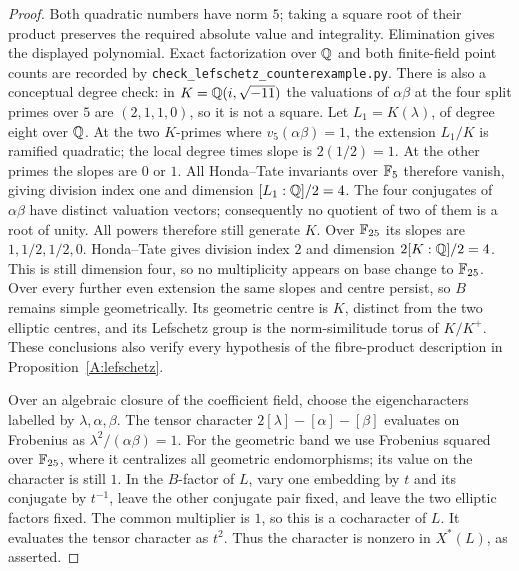\begin{proof}
Both quadratic numbers have norm $5$; taking a square root of
their product preserves the required absolute value and
integrality. Elimination gives the displayed polynomial. Exact
factorization over $\mathbb Q$ and both finite-field point counts are
recorded by \texttt{check\_lefschetz\_counterexample.py}.
There is also a conceptual degree check: in
$K=\mathbb Q(i,\sqrt{-11})$ the valuations of $\alpha\beta$ at the
four split primes over $5$ are $(2,1,1,0)$, so it is not a square.
Let $L_1=K(\lambda)$, of degree eight over $\mathbb Q$. At the two
$K$-primes where $v_5(\alpha\beta)=1$, the extension $L_1/K$
is ramified quadratic; the local degree times slope is
$2(1/2)=1$. At the other primes the slopes are $0$ or $1$.
All Honda--Tate invariants over $\mathbb F_5$ therefore vanish, giving
division index one and dimension $[L_1:\mathbb Q]/2=4$.
The four conjugates of $\alpha\beta$ have distinct valuation vectors; consequently
no quotient of two of them is a root of unity. All powers
therefore still generate $K$. Over $\mathbb F_{25}$ its slopes are
$1,1/2,1/2,0$. Honda--Tate gives division index $2$ and dimension
$2[K:\mathbb Q]/2=4$. This is still dimension four, so no multiplicity appears on
base change to $\mathbb F_{25}$. Over every further even extension the
same slopes and centre persist, so $B$ remains simple geometrically.
Its geometric centre is $K$, distinct from the two elliptic
centres, and its Lefschetz group is the norm-similitude torus
of $K/K^+$. These conclusions also verify every hypothesis of the
fibre-product description in Proposition~\ref{A:lefschetz}.

Over an algebraic closure of the coefficient field, choose the
eigencharacters labelled by $\lambda,\alpha,\beta$. The tensor
character $2[\lambda]-[\alpha]-[\beta]$ evaluates on Frobenius
as $\lambda^2/(\alpha\beta)=1$. For the geometric band we
use Frobenius squared over $\mathbb F_{25}$, where it centralizes all
geometric endomorphisms; its value on the character is still $1$.
In the $B$-factor of $L$,
vary one embedding by $t$ and its conjugate by $t^{-1}$,
leave the other conjugate pair fixed, and leave the two elliptic
factors fixed. The common multiplier is $1$, so this is a
cocharacter of $L$. It evaluates the tensor character as $t^2$.
Thus the character is nonzero in $X^*(L)$, as asserted.
\end{proof}


